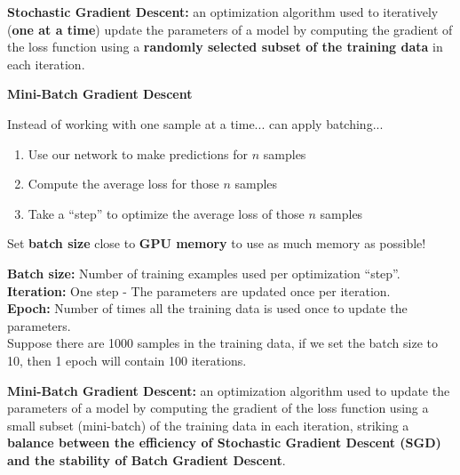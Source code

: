 \begin{definition}
    \textbf{Stochastic Gradient Descent:} an optimization algorithm used to iteratively (\textbf{one at a time}) update the parameters of a model by computing the gradient of the loss function using a \textbf{randomly selected subset of the training data} in each iteration.
\end{definition}

\noindent\textbf{Mini-Batch Gradient Descent}

Instead of working with one sample at a time... can apply batching...
\begin{enumerate}
    \item Use our network to make predictions for $n$ samples
    \item Compute the average loss for those $n$ samples
    \item Take a “step” to optimize the average loss of those $n$ samples
\end{enumerate}

\begin{theorem}
    Set \textbf{batch size} close to \textbf{GPU memory} to use as much memory as possible!
\end{theorem}

\noindent\textbf{Batch size:} Number of training examples used per optimization “step”. \\
\noindent\textbf{Iteration:} One step - The parameters are updated once per iteration. \\
\textbf{Epoch:} Number of times all the training data is used once to update the parameters. \\
Suppose there are 1000 samples in the training data, if we set the batch size to 10, then 1 epoch will contain 100 iterations.

\begin{definition}
    \textbf{Mini-Batch Gradient Descent:} an optimization algorithm used to update the parameters of a model by computing the gradient of the loss function using a small subset (mini-batch) of the training data in each iteration, striking a \textbf{balance between the efficiency of Stochastic Gradient Descent (SGD) and the stability of Batch Gradient Descent}.
\end{definition}

